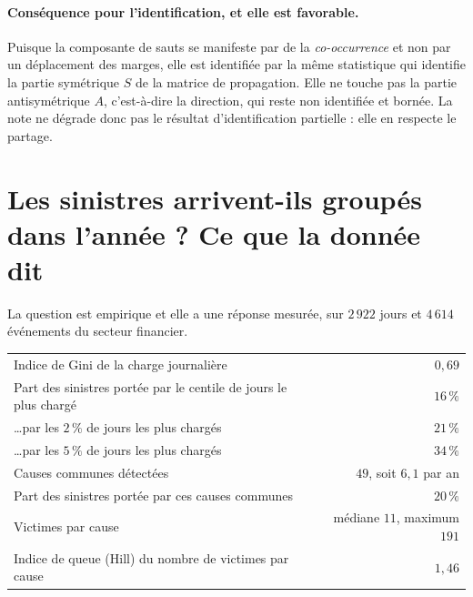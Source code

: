 \documentclass[11pt,a4paper]{article}
\begin{document}
\paragraph{Conséquence pour l'identification, et elle est favorable.} Puisque la composante
de sauts se manifeste par de la \emph{co-occurrence} et non par un déplacement des marges,
elle est identifiée par la même statistique qui identifie la partie symétrique $S$ de la
matrice de propagation. Elle ne touche pas la partie antisymétrique $A$, c'est-à-dire la
direction, qui reste non identifiée et bornée. La note ne dégrade donc pas le résultat
d'identification partielle : elle en respecte le partage.

\section{Les sinistres arrivent-ils groupés dans l'année ? Ce que la donnée dit}
\label{sec:groupement}


La question est empirique et elle a une réponse mesurée, sur $2\,922$ jours et $4\,614$
événements du secteur financier.

\begin{center}\small
\renewcommand{\arraystretch}{1.25}
\begin{tabular}{@{}l r@{}}
\toprule
Indice de Gini de la charge journalière & $0{,}69$ \\
Part des sinistres portée par le centile de jours le plus chargé & $16\,\%$ \\
\dots par les $2\,\%$ de jours les plus chargés & $21\,\%$ \\
\dots par les $5\,\%$ de jours les plus chargés & $34\,\%$ \\
Causes communes détectées & $49$, soit $6{,}1$ par an \\
Part des sinistres portée par ces causes communes & $20\,\%$ \\
Victimes par cause & médiane $11$, maximum $191$ \\
Indice de queue (Hill) du nombre de victimes par cause & $1{,}46$ \\
\bottomrule
\end{tabular}
\end{center}
\end{document}
